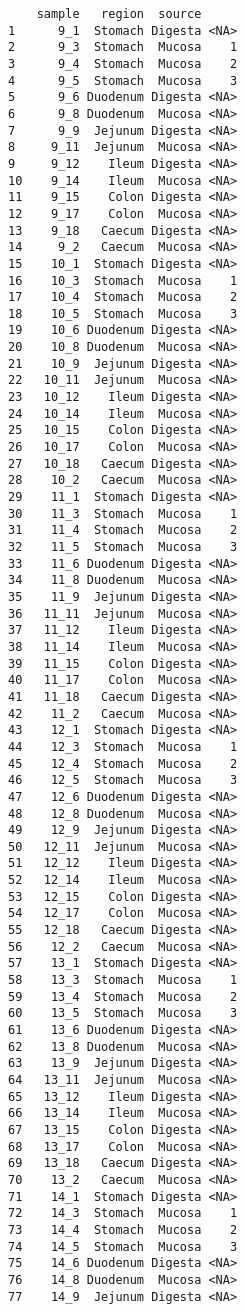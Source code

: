 \documentclass[
  letterpaper,
  DIV=11,
  numbers=noendperiod]{scrartcl}
\begin{document}
\begin{verbatim}
    sample   region  source     
1      9_1  Stomach Digesta <NA>
2      9_3  Stomach  Mucosa    1
3      9_4  Stomach  Mucosa    2
4      9_5  Stomach  Mucosa    3
5      9_6 Duodenum Digesta <NA>
6      9_8 Duodenum  Mucosa <NA>
7      9_9  Jejunum Digesta <NA>
8     9_11  Jejunum  Mucosa <NA>
9     9_12    Ileum Digesta <NA>
10    9_14    Ileum  Mucosa <NA>
11    9_15    Colon Digesta <NA>
12    9_17    Colon  Mucosa <NA>
13    9_18   Caecum Digesta <NA>
14     9_2   Caecum  Mucosa <NA>
15    10_1  Stomach Digesta <NA>
16    10_3  Stomach  Mucosa    1
17    10_4  Stomach  Mucosa    2
18    10_5  Stomach  Mucosa    3
19    10_6 Duodenum Digesta <NA>
20    10_8 Duodenum  Mucosa <NA>
21    10_9  Jejunum Digesta <NA>
22   10_11  Jejunum  Mucosa <NA>
23   10_12    Ileum Digesta <NA>
24   10_14    Ileum  Mucosa <NA>
25   10_15    Colon Digesta <NA>
26   10_17    Colon  Mucosa <NA>
27   10_18   Caecum Digesta <NA>
28    10_2   Caecum  Mucosa <NA>
29    11_1  Stomach Digesta <NA>
30    11_3  Stomach  Mucosa    1
31    11_4  Stomach  Mucosa    2
32    11_5  Stomach  Mucosa    3
33    11_6 Duodenum Digesta <NA>
34    11_8 Duodenum  Mucosa <NA>
35    11_9  Jejunum Digesta <NA>
36   11_11  Jejunum  Mucosa <NA>
37   11_12    Ileum Digesta <NA>
38   11_14    Ileum  Mucosa <NA>
39   11_15    Colon Digesta <NA>
40   11_17    Colon  Mucosa <NA>
41   11_18   Caecum Digesta <NA>
42    11_2   Caecum  Mucosa <NA>
43    12_1  Stomach Digesta <NA>
44    12_3  Stomach  Mucosa    1
45    12_4  Stomach  Mucosa    2
46    12_5  Stomach  Mucosa    3
47    12_6 Duodenum Digesta <NA>
48    12_8 Duodenum  Mucosa <NA>
49    12_9  Jejunum Digesta <NA>
50   12_11  Jejunum  Mucosa <NA>
51   12_12    Ileum Digesta <NA>
52   12_14    Ileum  Mucosa <NA>
53   12_15    Colon Digesta <NA>
54   12_17    Colon  Mucosa <NA>
55   12_18   Caecum Digesta <NA>
56    12_2   Caecum  Mucosa <NA>
57    13_1  Stomach Digesta <NA>
58    13_3  Stomach  Mucosa    1
59    13_4  Stomach  Mucosa    2
60    13_5  Stomach  Mucosa    3
61    13_6 Duodenum Digesta <NA>
62    13_8 Duodenum  Mucosa <NA>
63    13_9  Jejunum Digesta <NA>
64   13_11  Jejunum  Mucosa <NA>
65   13_12    Ileum Digesta <NA>
66   13_14    Ileum  Mucosa <NA>
67   13_15    Colon Digesta <NA>
68   13_17    Colon  Mucosa <NA>
69   13_18   Caecum Digesta <NA>
70    13_2   Caecum  Mucosa <NA>
71    14_1  Stomach Digesta <NA>
72    14_3  Stomach  Mucosa    1
73    14_4  Stomach  Mucosa    2
74    14_5  Stomach  Mucosa    3
75    14_6 Duodenum Digesta <NA>
76    14_8 Duodenum  Mucosa <NA>
77    14_9  Jejunum Digesta <NA>

\end{verbatim}
\end{document}

